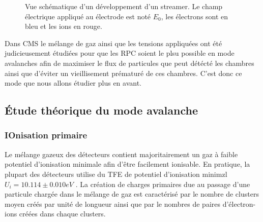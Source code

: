 \begin{figure}[ht!]
    \hfill
	\caption{Vue schématique d'un développement d'un streamer. Le champ électrique appliqué au électrode est noté $E_{0}$, les électrons sont en bleu et les ions en rouge.}
	\label{spark}
\end{figure}


Dans CMS le mélange de gaz ainsi que les tensions appliquées ont été judicieusement étudiées pour que les RPC soient le plsu possible en mode avalanches afin de maximiser le flux de particules que peut détécté les chambres ainsi que d'éviter un vieillisement prématuré de ces chambres. C'est donc ce mode que nous allons étudier plus en avant.

\subsection{Étude théorique du mode avalanche}

\subsubsection{IOnisation primaire}
Le mélange gazeux des détecteurs contient majoritairement un gaz à faible potentiel d'ionisation minimale afin d'être facilement ionisable. En pratique, la plupart des détecteurs utilise du TFE de potentiel d'ionisation minimzl $U_{i}=10.114 \pm0.010eV$ \cite{Chimie:chimie}. La création de charges primaires due au passage d'une particule chargée dans le mélange de gaz est caractérisé par le nombre de clusters moyen créés par unité de longueur ainsi que par le nombres de paires d'électron-ions créées dans chaque clusters.


